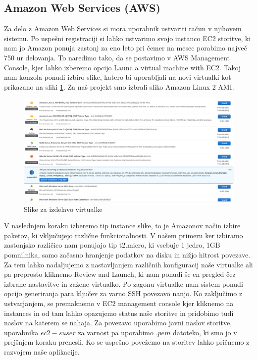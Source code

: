 \subsection{Amazon Web Services (AWS)}
Za delo z Amazon Web Services si mora uporabnik ustvariti račun v njihovem sistemu. Po uspešni registraciji si lahko ustvarimo svojo instanco EC2 storitve, ki nam jo Amazon ponuja zastonj za eno leto pri čemer na mesec porabimo največ 750 ur delovanja. To naredimo tako, da se postavimo v AWS Management Console, kjer lahko izberemo opcijo Launc a virtual machine with EC2. Takoj nam konzola ponudi izbiro slike, katero bi uporabljali na novi virtualki kot prikazano na sliki \ref{fig:1_AWS_images}. Za naš projekt smo izbrali sliko Amazon Linux 2 AMI. 
\begin{figure}[H]
    \centering
    \includegraphics[scale=0.25]{Img/1_AWS_images.png}
    \caption{Slike za izdelavo virtualke}
    \label{fig:1_AWS_images}
\end{figure}
V naslednjem koraku izberemo tip instance slike, to je Amazonov način izbire paketov, ki vključujejo različne funkcionalnosti. V našem primeru ker izbiramo zastonjsko različico nam ponujajo tip t2.micro, ki vsebuje 1 jedro, 1GB pomnilnika, samo začasno hranjenje podatkov na disku in nižjo hitrost povezave. Za tem lahko nadaljujemo z nastavljanjem različnih konfiguracij naše virtualke ali pa preprosto kliknemo Review and Launch, ki nam ponudi še en pregled čez izbrane nastavitve in zažene virtualko.  Po zagonu virtualke nam sistem ponudi opcijo generiranja para ključev za varno SSH povezavo nanjo. Ko zaključimo z ustvarjanjem, se premaknemo v EC2 management console kjer kliknemo na instances in od tam lahko opazujemo status naše storitve in pridobimo tudi naslov na katerem se nahaja. Za povezavo uporabimo javni naslov storitve, uporabnika $ec2-suser$ za varnost pa uporabimo $.pem$ datoteko, ki smo jo v prejšnjem koraku prenesli. Ko se uspešno povežemo na storitev lahko pričnemo z razvojem naše aplikacije.

